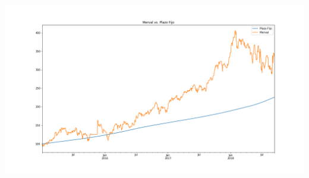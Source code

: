 \documentclass[12pt,aspectratio=169]{beamer}
\begin{document}
\begin{frame}
\centering
\includegraphics[height=.9\paperheight]{plazofijovsmerval.png}
\end{frame}
\end{document}
